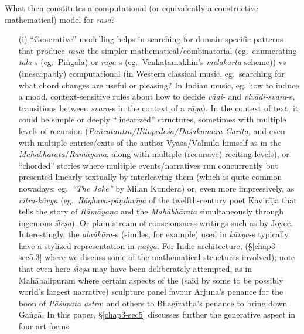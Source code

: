 What then constitutes a computational (or equivalently a constructive mathematical) model for \textsl{rasa}?
\begin{itemize}
\item[(i)] \underline{“Generative” modelling} helps in searching for domain-specific patterns that produce \textsl{rasa}: the simpler mathematical/combi\-natorial (eg.~enumerating \textsl{tāla}-s (eg.~Piṅgala) or \textsl{rāga}-s (eg.~Venkaṭamakhin's \textsl{melakarta} scheme)) vs (inescapably) computational (in Western classical music, eg.~searching for what chord changes are useful or pleasing? In Indian music, eg. how to induce a mood, context-sensitive rules about how to decide \textsl{vādi-} and \textsl{vivādi-svara}-s, transitions between \hbox{\textsl{svara}-s} in the context of a \textsl{rāga}). In the context of text, it could be simple or deeply “linearized” structures, sometimes with multiple levels of recursion (\textsl{Pañcatantra/Hitopedeśa/Daśakumāra Carita}, and even with multiple entries/exits of the author Vyāsa/Vālmikī himself as in the \textsl{Mahābhārata}/\textsl{Rāmāyaṇa}, along with multiple (recursive) reciting levels), or “chorded” stories where multiple events/narratives run concurrently but presented linearly textually by interleaving them (which is quite common nowadays: eg.~\textsl{“The Joke”} by Milan Kundera) or, even more impressively, as \textsl{citra-kāvya} (eg.~\textsl{Rāghava-pāṇḍavīya} of the twelfth-century poet Kavirāja that tells the story of \textsl{Rāmāyaṇa} and the \textsl{Mahābhārata} simultaneously through ingenious \textsl{śleṣa}). Or plain stream of consciousness writings such as by Joyce. Interestingly, the \textsl{alaṅkāra-}s (similes, for example) used in \hbox{\textsl{kāvya}-s} typically have a stylized representation in \textsl{nāṭya}. For Indic architecture, (\S\ref{chap3-sec5.3} where we discuss some of the mathematical structures involved); note that even here \textsl{śleṣa} may have been deliberately attempted, as in Mahābalipuram where certain aspects of the (said by some to be possibly world's largest narrative) sculpture panel favour Arjuna’s penance for the boon of \textsl{Pāśupata astra}; and others to Bhagīratha’s penance to bring down Gaṅgā. In this paper, \S\ref{chap3-sec5} discusses further the generative aspect in four art forms.


\end{itemize}
